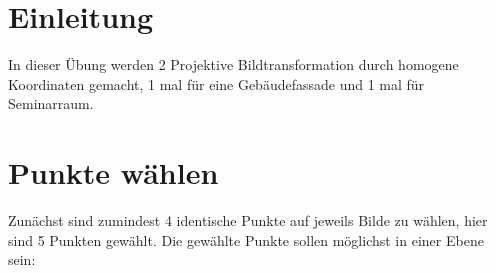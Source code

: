 \documentclass[12pt]{article}
\begin{document}
	\pagestyle{main}
\section{Einleitung}
In dieser Übung werden 2 Projektive Bildtransformation durch homogene Koordinaten gemacht, 1 mal für eine Gebäudefassade und 1 mal für Seminarraum. 
\section{Punkte wählen}
Zunächst sind zumindest 4 identische Punkte auf jeweils Bilde zu wählen, hier sind 5 Punkten gewählt. Die gewählte Punkte sollen möglichst in einer Ebene sein:
\begin{figure}[ht]\centering
\end{figure}
\begin{figure}[ht]\centering
\end{figure}
\end{document}
